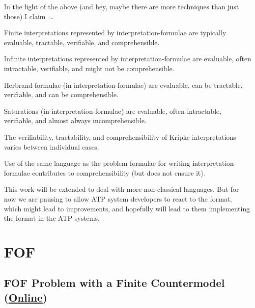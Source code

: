 \documentclass{easychair}
\newenvironment{packed_itemize}{
\vspace*{-0.3em}
\begin{itemize}
\setlength{\partopsep}{0pt}
\setlength{\itemsep}{1pt}
\setlength{\parskip}{0pt}
\setlength{\parsep}{0pt}
}{\end{itemize}}
\begin{document}
In the light of the above (and hey, maybe there are more techniques than just those) I claim~\ldots
\begin{packed_itemize}
\item Finite interpretations represented by interpretation-formulae are typically evaluable,
      tractable, verifiable, and comprehensible.
\item Infinite interpretations represented by interpretation-formulae are evaluable, often 
      intractable, verifiable, and might not be comprehensible.
\item Herbrand-formulae (in interpretation-formulae) are evaluable, can be tractable, verifiable, 
      and can be comprehensible.
\item Saturations (in interpretation-formulae) are evaluable, often intractable, verifiable, 
      and almost always incomprehensible.
\item The verifiability, tractability, and comprehensibility of Kripke interpretations varies
      between individual cases.
\item Use of the same language as the problem formulae for writing interpretation-formulae
      contributes to comprehensibility (but does not ensure it).
\end{packed_itemize}

This work will be extended to deal with more non-classical languages.
But for now we are pausing to allow ATP system developers to react to the format, which might 
lead to improvements, and hopefully will lead to them implementing the format in the ATP systems.



\appendix

\newpage
\section{FOF}
\label{FOF}

\subsection{FOF Problem with a Finite Countermodel
(\href{https://raw.githubusercontent.com/GeoffsPapers/InterpretationFormat/master/Examples/FOF_Finite.p}{Online})}
\label{FOF_Finite.p}
\begin{small}

\end{small}
\end{document}
